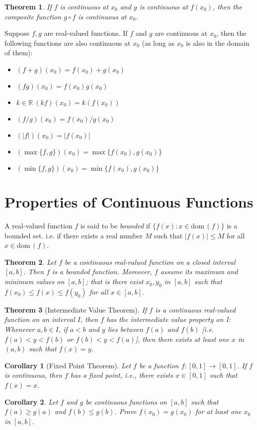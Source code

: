\documentclass[12pt, lettersize]{book}
\theoremstyle{plain}
\newtheorem{thm}{Theorem}[section]
\newtheorem{cor}{Corollary}[thm]
\theoremstyle{definition}
\theoremstyle{remark}
\newcommand{\R}{\mathbb{R}}
\newcommand{\dom}{\text{dom}\,}
\begin{document}
		\begin{thm}\label{def:17.5}
			If $f$ is continuous at $x_0$ and $g$ is continuous at $f(x_0)$, then the composite function $g\circ f$ is
			continuous at $x_0$.
		\end{thm}
		
		\begin{tcolorbox}[title=Conclusion]
			Suppose $f,g$ are real-valued functions. If $f$ and $g$ are continuous at $x_0$, then the following functions are also continuous at $x_0$ (as long as $x_0$ is also in the domain of them):
			\begin{itemize}
				\item $(f+g)(x_0)=f(x_0)+g(x_0)$
				\item $(fg)(x_0)=f(x_0)g(x_0)$
				\item $k\in\R\ (kf)(x_0)=k(f(x_0))$
				\item $(f/g)(x_0)=f(x_0)/g(x_0)$
				\item $(|f|)(x_0)=|f(x_0)|$
				\item $(\max\{f,g\})(x_0)=\max\{f(x_0),g(x_0)\}$
				\item $(\min\{f,g\})(x_0)=\min\{f(x_0),g(x_0)\}$
			\end{itemize}
		\end{tcolorbox}
		
		\newpage
		
		\section{Properties of Continuous Functions}
		A real-valued function $f$ is said to be \emph{bounded} if $\{f(x): x\in\dom(f)\}$ is a bounded set. i.e. if
		there exists a real number $M$ such that $|f(x)|\leq M$ for all $x\in\dom(f)$.
		
		\begin{thm}\label{def:18.1}
			Let $f$ be a continuous real-valued function on a \emph{closed} interval $[a,b]$. Then $f$ is a bounded function.
			Moreover, $f$ assume its maximum and minimum values on $[a,b]$; that is there exist $x_0,y_0$ in $[a,b]$
			such that $f(x_0)\leq f(x)\leq f(y_0)$ for all $x\in[a,b]$.
		\end{thm}
		
		\begin{thm}[Intermediate Value Theorem]\label{thm:18.2}
			If $f$ is a continuous real-valued function on an interval $I$, then $f$ has the intermediate value property on I: Whenever $a,b\in I$, if $a<b$ and $y$ lies between $f(a)$ and $f(b)$ [i.e. $f(a)<y<f(b)$ or $f(b)<y<f(a)$], then there exists at least one $x$ in
			$(a,b)$ such that $f(x)=y$.
		\end{thm}
		\begin{cor}[Fixed Point Theorem]
			Let $f$ be a function $f:[0,1]\rightarrow[0,1]$. If $f$ is continuous, then $f$ has a fixed point, i.e., there exists $x\in[0,1]$ such that $f(x)=x$.
		\end{cor}
		\begin{cor}
			Let $f$ and $g$ be continuous functions on $[a,b]$ such that $f(a)\geq g(a)$ and $f(b)\leq g(b)$. Prove $f(x_0)=g(x_0)$ for at least one $x_0$ in $[a,b]$.
		\end{cor}
		
\end{document}
